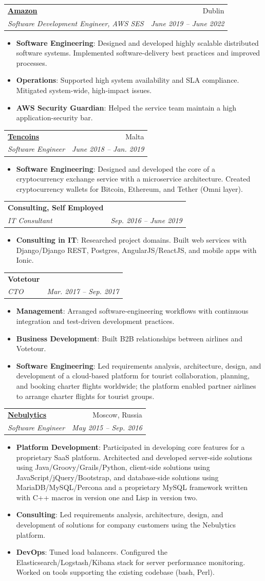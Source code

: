\documentclass[letterpaper,11pt]{article}
\makeatletter
\newcommand{\resumeItem}[2]{
  \item\small{
    \textbf{#1}{: #2 \vspace{-2pt}}
  }
}
\newcommand{\resumeSubheading}[4]{
  \vspace{-1pt}\item
    \begin{tabular*}{0.97\textwidth}{l@{\extracolsep{\fill}}r}
      \textbf{#1} & #2 \\
      \textit{\small#3} & \textit{\small #4} \\
    \end{tabular*}\vspace{-5pt}
}
\newcommand{\resumeItemListStart}{\begin{itemize}}
\newcommand{\resumeItemListEnd}{\end{itemize}\vspace{-5pt}}
\makeatother
\begin{document}
   \resumeSubheading
      {\href{https://aws.amazon.com/}{Amazon}}{Dublin}
      {Software Development Engineer, AWS SES}{June 2019 -- June 2022}
      \resumeItemListStart
        \resumeItem{Software Engineering}
                   {Designed and developed highly scalable distributed software systems. Implemented software-delivery best practices and improved processes.}
        \resumeItem{Operations}
                   {Supported high system availability and SLA compliance. Mitigated system-wide, high-impact issues.}
        \resumeItem{AWS Security Guardian}
                   {Helped the service team maintain a high application-security bar.}
    \resumeItemListEnd
  
   \resumeSubheading
      {\href{https://tencoins.org}{Tencoins}}{Malta}
      {Software Engineer}{June 2018 -- Jan. 2019}
      \resumeItemListStart
        \resumeItem{Software Engineering}
          {Designed and developed the core of a cryptocurrency exchange service with a microservice architecture. Created cryptocurrency wallets for Bitcoin, Ethereum, and Tether (Omni layer).}
    \resumeItemListEnd

    \resumeSubheading
      {Consulting, Self Employed}{}
      {IT Consultant}{Sep. 2016 -- June 2019}
      \resumeItemListStart
        \resumeItem{Consulting in IT}
          {Researched project domains. Built web services with Django/Django REST, Postgres, AngularJS/ReactJS, and mobile apps with Ionic.}
    \resumeItemListEnd

    \resumeSubheading
      {Votetour}{}
      {CTO}{Mar. 2017 -- Sep. 2017}
      \resumeItemListStart
        \resumeItem{Management}
          {Arranged software-engineering workflows with continuous integration and test-driven development practices.}
        \resumeItem{Business Development}
          {Built B2B relationships between airlines and Votetour.}
        \resumeItem{Software Engineering}
          {Led requirements analysis, architecture, design, and development of a cloud-based platform for tourist collaboration, planning, and booking charter flights worldwide; the platform enabled partner airlines to arrange charter flights for tourist groups.}
    \resumeItemListEnd

    \resumeSubheading
      {\href{http://nebulytics.com}{Nebulytics}}{Moscow, Russia}
      {Software Engineer}{May 2015 -- Sep. 2016}
      \resumeItemListStart
        \resumeItem{Platform Development}
          {Participated in developing core features for a proprietary SaaS platform. Architected and developed server-side solutions using Java/Groovy/Grails/Python, client-side solutions using JavaScript/jQuery/Bootstrap, and database-side solutions using MariaDB/MySQL/Percona and a proprietary MySQL framework written with C++ macros in version one and Lisp in version two.}
        \resumeItem{Consulting}
          {Led requirements analysis, architecture, design, and development of solutions for company customers using the Nebulytics platform.}
        \resumeItem{DevOps}
          {Tuned load balancers. Configured the Elasticsearch/Logstash/Kibana stack for server performance monitoring. Worked on tools supporting the existing codebase (bash, Perl).}
      \resumeItemListEnd
\end{document}
